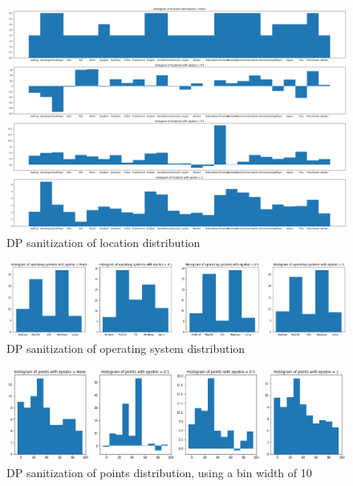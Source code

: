 \documentclass[a4paper]{scrreprt}
\begin{document}
\begin{figure}
  \centering
  \includegraphics[width=\textwidth]{resources/2_location.png}
  \caption{DP sanitization of location distribution}
\end{figure}

\begin{figure}
  \centering
  \includegraphics[width=\textwidth]{resources/2_system.png}
  \caption{DP sanitization of operating system distribution}
\end{figure}

\begin{figure}
  \centering
  \includegraphics[width=\textwidth]{resources/2_points.png}
  \caption{DP sanitization of points distribution, using a bin width of 10}
\end{figure}

\printbibliography
\end{document}
